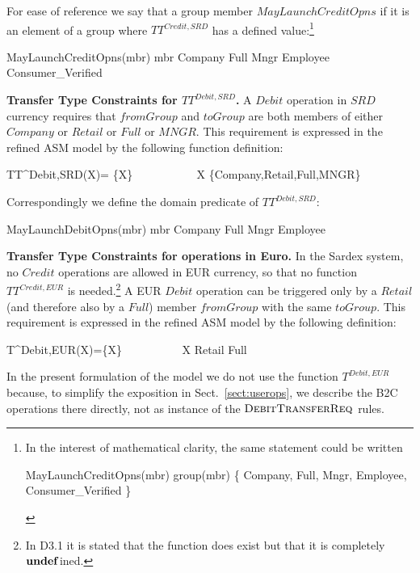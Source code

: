  For ease of reference we say that a group member $MayLaunchCreditOpns$ if it is an element of a group where $TT^{Credit,SRD}$ has a defined value:\footnote{In the interest of mathematical clarity, the same statement could be written
  \begin{asm}
 MayLaunchCreditOpns(mbr) \iff 
    group(mbr) \in \{ Company, Full, Mngr, Employee, Consumer\_Verified \}
    \end{asm} }
 \begin{asm}
 MayLaunchCreditOpns(mbr) \iff 
    mbr \in Company \cup Full \cup Mngr \cup Employee \cup Consumer\_Verified
    \end{asm}

{\bf Transfer Type Constraints for $TT^{Debit,SRD}$.} A $Debit$ operation in $SRD$ currency requires that $fromGroup$ and $toGroup$ are both members of either $Company$ or $Retail$ or $Full$ or $MNGR$. This requirement is expressed in the refined ASM model by the following function definition:
\begin{asm}
  TT^{Debit,SRD}(X)= \{X\} ~~~~~~~~~~ 
             	\FORALL X \in \{Company,Retail,Full,MNGR\}
\end{asm}
Correspondingly we define the domain predicate of $ TT^{Debit,SRD}$:
\begin{asm}
\label{debitdomaindef}
MayLaunchDebitOpns(mbr) \iff mbr \in Company \cup Full \cup Mngr \cup Employee
\end{asm}

{\bf Transfer Type Constraints for operations in Euro.} In the Sardex system, no $Credit$ operations are allowed in EUR currency, so that no function $TT^{Credit,EUR}$ is needed.\footnote{In D3.1 it is stated that the function does exist but that it is completely $\mathrel{\mathbf{undef}}$ined.} A EUR $Debit$ operation can be triggered only by a $Retail$ (and therefore also by a $Full$) member $fromGroup$ with the same $toGroup$. This requirement is expressed in the refined ASM model by the following definition:
\begin{asm}
T^{Debit,EUR}(X)=\{X\} ~~~~~~~~~~\FORALL X \in Retail \cup Full  
\end{asm}

In the present formulation of the model we do not use the function $T^{Debit,EUR}$ because, to simplify the exposition in Sect.~\ref{sect:userops}, we describe the B2C operations there directly, not as instance of the $\hbox{\sc DebitTransferReq}$ rules.

\vspace{12pt}

